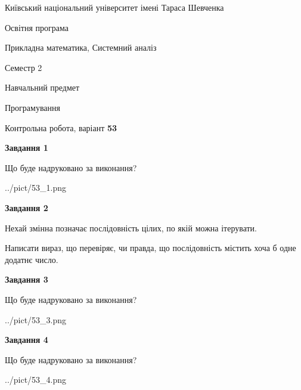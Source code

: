 \documentclass[12pt, ukrainian]{article}
\begin{document}
{{\begin {small}\par
{ \center  Київський національний університет імені Тараса Шевченка \par}
{\parbox {5 cm}{Освітня програма \hfill}{\parbox {8 cm}{Прикладна математика, Системний аналіз \hfill}}\parbox {5 cm}{\hfill Семестр 2}}\par
{\parbox {5 cm} {Навчальний предмет \hfill}\parbox {7 cm}{Програмування \hfill}\parbox {6cm}{\hfill}\par}\vspace{-7pt} \end{small}}{\center Контрольна робота, варіант  \No \textbf
{ 53 }\par}}
{
\begin {large}
{\begin {center}\textbf{Завдання 1}\end {center}}\par
Що буде надруковано за виконання?\par\par
\begin{center}
	{../pict/53_1.png}
\end{center}
\newpage

{\begin {center}\textbf{Завдання 2}\end {center}}\par
Нехай змінна  позначає послідовність цілих, по якій можна ітерувати.

Написати вираз, що перевіряє, чи правда, що послідовність  містить хоча б одне додатнє число.\par
\newpage

{\begin {center}\textbf{Завдання 3}\end {center}}\par
Що буде надруковано за виконання?
\begin{center}
	{../pict/53_3.png}
\end{center}
\newpage

{\begin {center}\textbf{Завдання 4}\end {center}}\par
Що буде надруковано за виконання?\par
\begin{center}
	{../pict/53_4.png}
\end{center}
\newpage


\end{large}}
\end{document}
